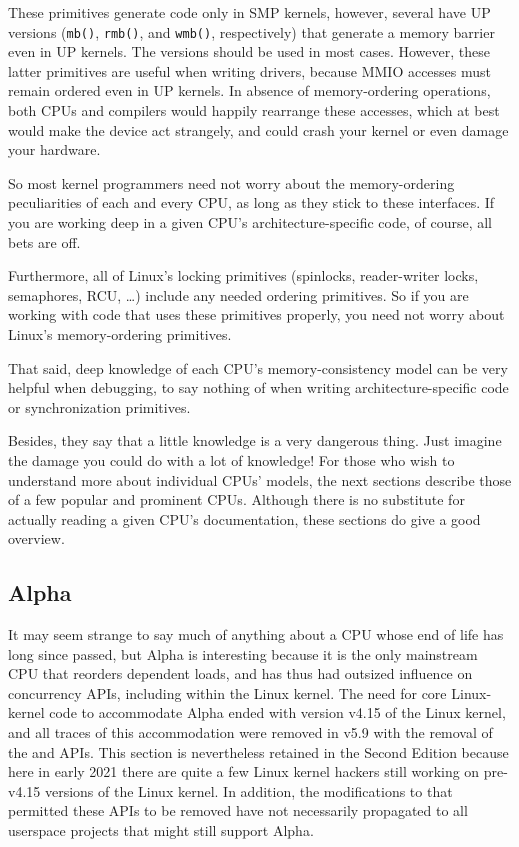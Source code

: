 These primitives generate code only in SMP kernels, however, several
have UP versions ({\tt mb()}, {\tt rmb()}, and {\tt wmb()},
respectively) that generate a memory barrier even in UP kernels.
The  versions should be used in most cases.
However, these latter primitives are useful when writing drivers,
because MMIO accesses must remain ordered even in UP kernels.
In absence of memory-ordering operations, both CPUs and compilers would
happily rearrange these accesses, which at best would make the device
act strangely, and could crash your kernel or even damage your hardware.

So most kernel programmers need not worry about the memory-ordering
peculiarities of each and every CPU, as long as they stick to these
interfaces.
If you are working deep in a given CPU's architecture-specific code,
of course, all bets are off.

Furthermore,
all of Linux's locking primitives (spinlocks, reader-writer locks,
semaphores, RCU, \ldots) include any needed ordering primitives.
So if you are working with code that uses these primitives properly,
you need not worry about Linux's memory-ordering primitives.

That said, deep knowledge of each CPU's memory-consistency model
can be very helpful when debugging, to say nothing of when writing
architecture-specific code or synchronization primitives.

Besides, they say that a little knowledge is a very dangerous thing.
Just imagine the damage you could do with a lot of knowledge!
For those who wish to understand more about individual CPUs'
 models, the next sections describe those of a few
popular and prominent CPUs.
Although there is no substitute for actually reading a given CPU's
documentation, these sections do give a good overview.

\subsection{Alpha}
\label{sec:memorder:Alpha}

It may seem strange to say much of anything about a CPU whose end of life
has long since passed, but Alpha is interesting because it is the only
mainstream CPU that reorders dependent loads, and has thus had outsized
influence on concurrency APIs, including within the Linux kernel.
The need for core Linux-kernel code to accommodate Alpha ended
with version v4.15 of the Linux kernel, and all traces of this
accommodation were removed in v5.9 with the removal of the
 and  APIs.
This section is nevertheless retained in the Second Edition
because here in early 2021 there are quite a few Linux kernel hackers
still working on pre-v4.15 versions of the Linux kernel.
In addition, the modifications to  that permitted
these APIs to be removed have not necessarily propagated to all
userspace projects that might still support Alpha.

